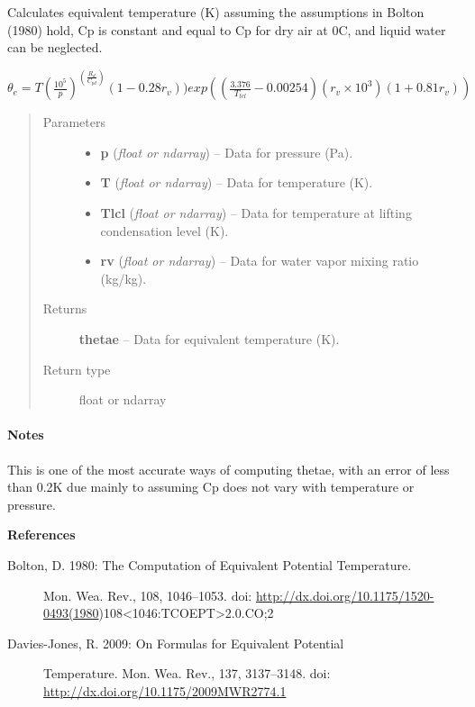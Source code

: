 \documentclass[letterpaper,10pt,english]{sphinxmanual}
\begin{document}
\begin{fulllineitems}
\label{atmos:atmos.equations.thetae_from_p_T_Tlcl_rv_Bolton}
Calculates equivalent temperature (K) assuming the assumptions in Bolton (1980)
hold, Cp is constant and equal to Cp for dry air at 0C, and liquid water can be
neglected.

\(\theta_e = T (\frac{10^5}{p})^(\frac{R_d}{C_{pd}})(1-0.28 r_v))
exp((\frac{3.376}{T_{lcl}}-0.00254) (r_v \times 10^3) (1+0.81 r_v))\)
\begin{quote}\begin{description}
\item[{Parameters}] \leavevmode\begin{itemize}
\item {} 
\textbf{p} (\emph{float or ndarray}) -- Data for pressure (Pa).

\item {} 
\textbf{T} (\emph{float or ndarray}) -- Data for temperature (K).

\item {} 
\textbf{Tlcl} (\emph{float or ndarray}) -- Data for temperature at lifting condensation level (K).

\item {} 
\textbf{rv} (\emph{float or ndarray}) -- Data for water vapor mixing ratio (kg/kg).

\end{itemize}

\item[{Returns}] \leavevmode
\textbf{thetae} --
Data for equivalent temperature (K).

\item[{Return type}] \leavevmode
float or ndarray

\end{description}\end{quote}
\paragraph{Notes}

This is one of the most accurate ways of computing thetae, with an
error of less than 0.2K due mainly to assuming Cp does not vary with
temperature or pressure.

\textbf{References}
\begin{description}
\item[{Bolton, D. 1980: The Computation of Equivalent Potential Temperature.}] \leavevmode
Mon. Wea. Rev., 108, 1046–1053.
doi: \href{http://dx.doi.org/10.1175/1520-0493(1980}{http://dx.doi.org/10.1175/1520-0493(1980})108\textless{}1046:TCOEPT\textgreater{}2.0.CO;2

\item[{Davies-Jones, R. 2009: On Formulas for Equivalent Potential}] \leavevmode
Temperature. Mon. Wea. Rev., 137, 3137–3148.
doi: \href{http://dx.doi.org/10.1175/2009MWR2774.1}{http://dx.doi.org/10.1175/2009MWR2774.1}

\end{description}

\end{fulllineitems}
\end{document}

